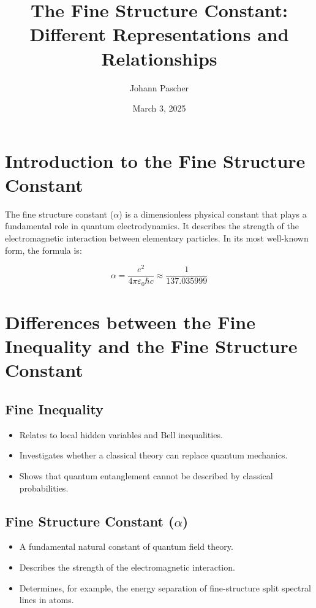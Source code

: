 \documentclass{article}
\title{The Fine Structure Constant: Different Representations and Relationships}
\author{Johann Pascher}
\date{March 3, 2025}
\begin{document}
	
	\maketitle
	\tableofcontents
	
	\section{Introduction to the Fine Structure Constant}
	
	The fine structure constant ($\alpha$) is a dimensionless physical constant that plays a fundamental role in quantum electrodynamics. It describes the strength of the electromagnetic interaction between elementary particles. In its most well-known form, the formula is:
	
	\begin{equation}
		\alpha = \frac{e^2}{4\pi\varepsilon_0\hbar c} \approx \frac{1}{137.035999}
	\end{equation}
	
	\section{Differences between the Fine Inequality and the Fine Structure Constant}
	
	\subsection{Fine Inequality}
	\begin{itemize}
		\item Relates to local hidden variables and Bell inequalities.
		\item Investigates whether a classical theory can replace quantum mechanics.
		\item Shows that quantum entanglement cannot be described by classical probabilities.
	\end{itemize}
	
	\subsection{Fine Structure Constant ($\alpha$)}
	\begin{itemize}
		\item A fundamental natural constant of quantum field theory.
		\item Describes the strength of the electromagnetic interaction.
		\item Determines, for example, the energy separation of fine-structure split spectral lines in atoms.
	\end{itemize}
	
\end{document}
